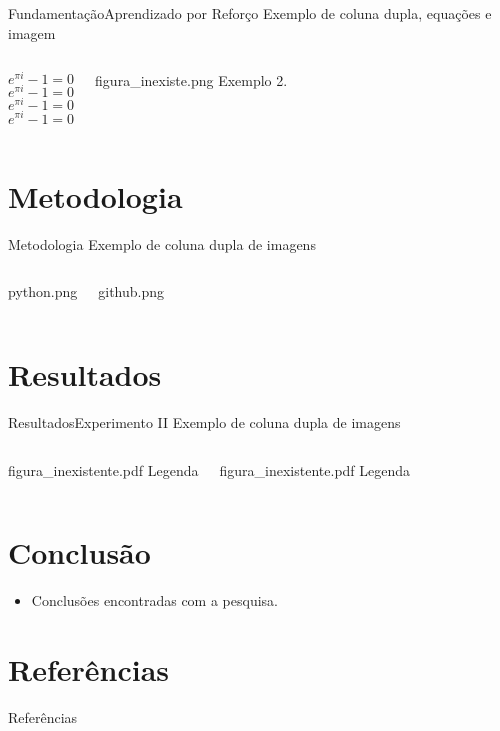 \documentclass[
11pt,notheorems,hyperref={pdfauthor=Autor}
]{beamer}
\begin{document}
\begin{frame}{Fundamentação}{Aprendizado por Reforço}
Exemplo de coluna dupla, equações e imagem

\begin{columns}[T,onlytextwidth]
    
    \Large{$$e^{\pi i}-1 =0$$}
    \LARGE{$$e^{\pi i}-1=0$$}
    \huge{$$e^{\pi i}-1=0$$}
    \Huge{$$e^{\pi i}-1=0$$}
    

    \FigureWithFallbackCaption
    {figura_inexiste.png}
    {Exemplo 2.}
\end{columns}
\end{frame}

\section{Metodologia}
\begin{frame}{Metodologia}
Exemplo de coluna dupla de imagens

\pause
    \begin{columns}[T]
    \FigureWithFallbackCaption
    {python.png}
    {}
    \pause

    \FigureWithFallbackCaption
    {github.png}
    {}
\end{columns}
\end{frame}

\section{Resultados}
\begin{frame}{Resultados}{Experimento II}
Exemplo de coluna dupla de imagens

\begin{columns}[T]
    \pause
    \FigureWithFallbackCaption
    {figura_inexistente.pdf}
    {Legenda}

    \pause
    \FigureWithFallbackCaption
    {figura_inexistente.pdf}
    {Legenda}
\end{columns}
\end{frame}


\section{Conclusão}
\begin{frame}
    \pause
    \begin{itemize}
        \item Conclusões encontradas com a pesquisa.
    \end{itemize}
\end{frame}


\section{Referências}
\begin{frame}[allowframebreaks]{Referências}
    \small
    \setlength{\leftmargini}{1.8em}
    \setlength{\bibitemsep}{0.25\baselineskip}
    \setlength{\bibhang}{1.0em}
    \raggedright
    \justifying
    \printbibliography
\end{frame}
\end{document}
